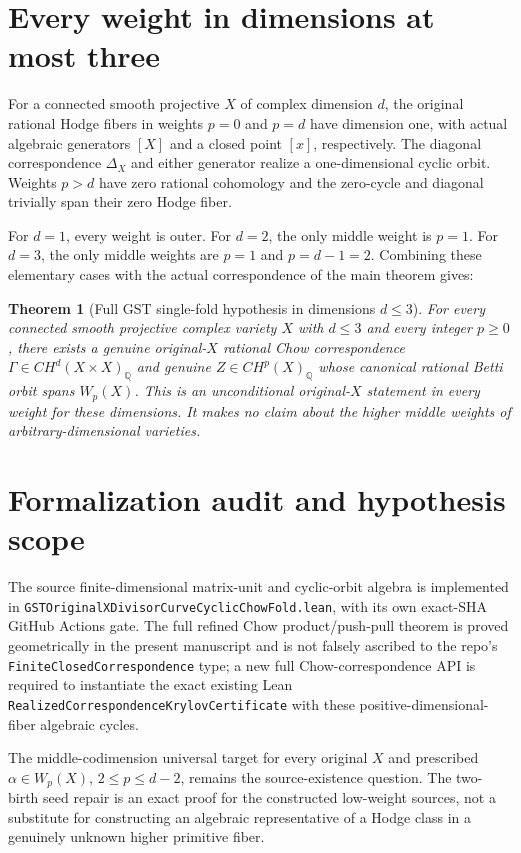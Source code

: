 \documentclass[11pt]{article}
\newtheorem{theorem}{Theorem}
\begin{document}
\section{Every weight in dimensions at most three}
For a connected smooth projective $X$ of complex dimension $d$,
the original rational Hodge fibers in weights $p=0$ and $p=d$
have dimension one, with actual algebraic generators $[X]$
and a closed point $[x]$, respectively. The diagonal correspondence
$\Delta_X$ and either generator realize a one-dimensional cyclic orbit.
Weights $p>d$ have zero rational cohomology and the zero-cycle
and diagonal trivially span their zero Hodge fiber.

For $d=1$, every weight is outer. For $d=2$, the only middle
weight is $p=1$. For $d=3$, the only middle weights are
$p=1$ and $p=d-1=2$. Combining these elementary cases with
the actual correspondence of the main theorem gives:

\begin{theorem}[Full GST single-fold hypothesis in dimensions $d\le3$]
For every connected smooth projective complex variety $X$ with
$d\le3$ and every integer $p\ge0$, there exists a genuine
original-$X$ rational Chow correspondence $\Gamma\in
CH^d(X\times X)_{\mathbb Q}$ and genuine $Z\in CH^p(X)_{\mathbb Q}$
whose canonical rational Betti orbit spans $W_p(X)$.
This is an unconditional original-$X$ statement in every weight
for these dimensions. It makes no claim about the higher middle
weights of arbitrary-dimensional varieties.
\end{theorem}

\section{Formalization audit and hypothesis scope}
The source finite-dimensional matrix-unit and cyclic-orbit algebra
is implemented in
\texttt{GSTOriginalXDivisorCurveCyclicChowFold.lean}, with
its own exact-SHA GitHub Actions gate.
The full refined Chow product/push-pull theorem is proved
geometrically in the present manuscript and is not falsely
ascribed to the repo's \texttt{FiniteClosedCorrespondence}
type; a new full Chow-correspondence API is required to
instantiate the exact existing Lean
\texttt{RealizedCorrespondenceKrylovCertificate}
with these positive-dimensional-fiber algebraic cycles.

The middle-codimension universal target for every original $X$
and prescribed $\alpha\in W_p(X)$, $2\le p\le d-2$,
remains the source-existence question. The two-birth seed repair
is an exact proof for the constructed low-weight sources,
not a substitute for constructing an algebraic representative
of a Hodge class in a genuinely unknown higher primitive fiber.
\end{document}
